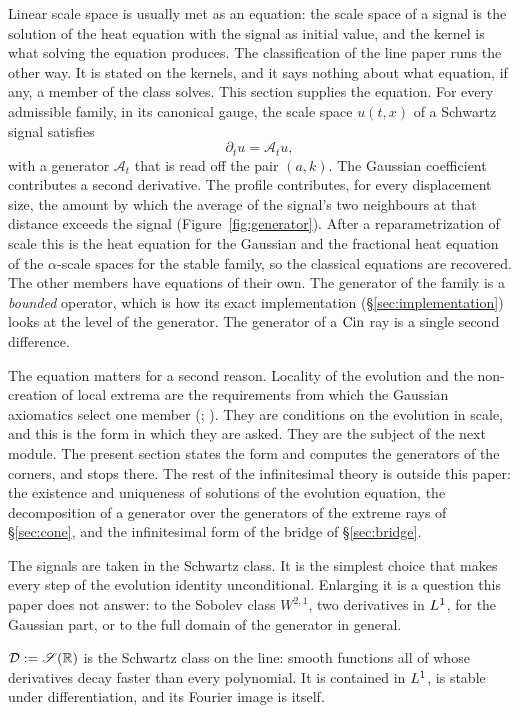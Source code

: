 Linear scale space is usually met as an equation: the scale space of a signal is the solution
of the heat equation with the signal as initial value, and the kernel is what solving the
equation produces. The classification of the line paper runs the other way. It is stated on
the kernels, and it says nothing about what equation, if any, a member of the class solves.
This section supplies the equation. For every admissible family, in its canonical gauge, the
scale space $u(t,x)$ of a Schwartz signal satisfies
\[
  \partial_t u = \mathcal{A}_t u ,
\]
with a generator $\mathcal{A}_t$ that is read off the pair $(a,k)$. The Gaussian coefficient
contributes a second derivative. The profile contributes, for every displacement size, the
amount by which the average of the signal's two neighbours at that distance exceeds the signal
(Figure~\ref{fig:generator}). After a reparametrization of scale this is the heat equation for
the Gaussian and the fractional heat equation of the $\alpha$-scale spaces for the stable
family, so the classical equations are recovered. The other members have equations of their
own. The generator of the \Matern{} family is a \emph{bounded} operator, which is how its
exact implementation (\S\ref{sec:implementation}) looks at the level of the generator. The
generator of a $\operatorname{Cin}$ ray is a single second difference.

The equation matters for a second reason. Locality of the evolution and the non-creation of
local extrema are the requirements from which the Gaussian axiomatics select one member
(; ). They are conditions on
the evolution in scale, and this is the form in which they are asked. They are the subject of
the next module. The present section states the form and computes the generators of the
corners, and stops there. The rest of the infinitesimal theory is outside this paper: the
existence and uniqueness of solutions of the evolution equation, the decomposition of a
generator over the generators of the extreme rays of \S\ref{sec:cone}, and the infinitesimal
form of the bridge of \S\ref{sec:bridge}.

The signals are taken in the Schwartz class. It is the simplest choice that makes every step
of the evolution identity unconditional. Enlarging it is a question this paper does not
answer: to the Sobolev class $W^{2,1}$, two derivatives in $L^1$, for the Gaussian part, or
to the full domain of the generator in general.

\begin{definition}\label{def:signal-class}
$\mathcal{D} := \mathscr{S}(\mathbb{R})$ is the Schwartz class on the line: smooth functions all of whose
derivatives decay faster than every polynomial. It is contained in $L^1$, is stable under
differentiation, and its Fourier image is itself.
\end{definition}

